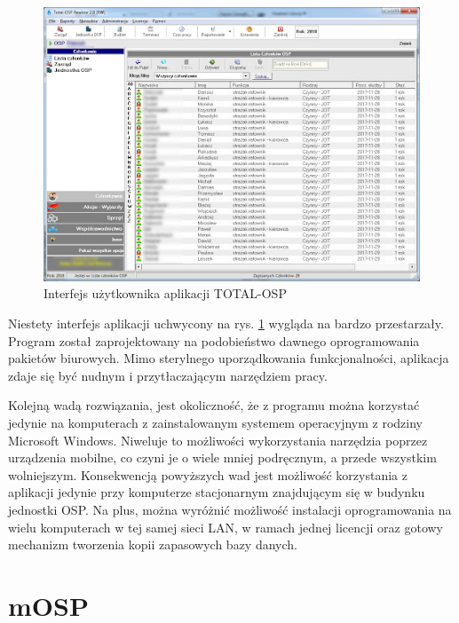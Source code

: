 \begin{figure}
    \centering
    \includegraphics[width=\textwidth]{img/chapter2/total-osp.jpg}
    \caption{Interfejs użytkownika aplikacji TOTAL-OSP}
    \label{fig:TOTAL-OSP}
\end{figure}


Niestety interfejs aplikacji uchwycony na rys. \ref{fig:TOTAL-OSP} wygląda na bardzo przestarzały. Program został zaprojektowany na podobieństwo dawnego oprogramowania pakietów biurowych. Mimo sterylnego uporządkowania funkcjonalności, aplikacja zdaje się być nudnym i przytłaczającym narzędziem pracy.

Kolejną wadą rozwiązania, jest okoliczność, że z programu można korzystać jedynie na komputerach z zainstalowanym systemem operacyjnym z rodziny Microsoft Windows. Niweluje to możliwości wykorzystania narzędzia poprzez urządzenia mobilne, co czyni je o wiele mniej podręcznym, a przede wszystkim wolniejszym. Konsekwencją powyższych wad jest możliwość korzystania z aplikacji jedynie przy komputerze stacjonarnym znajdującym się w budynku jednostki OSP. 
Na plus, można wyróżnić możliwość instalacji oprogramowania na wielu komputerach w tej samej sieci LAN, w ramach jednej licencji oraz gotowy mechanizm tworzenia kopii zapasowych bazy danych. 


\section{mOSP}

